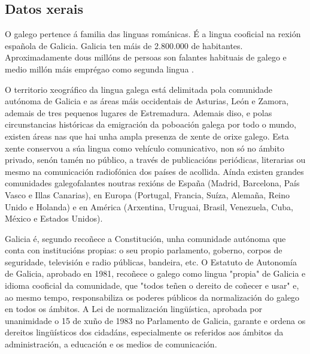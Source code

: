 \clearpage


\begin{multicols}{2}

\subsection{Datos xerais}

    O galego pertence á familia das linguas románicas. É a lingua cooficial na rexión española de Galicia. Galicia ten máis de 2.800.000 de habitantes. Aproximadamente dous millóns de persoas son falantes habituais de galego e medio millón máis emprégao como segunda lingua \cite{GAL-Nota5,GAL-Nota6}.


O territorio xeográfico da lingua galega está delimitada pola comunidade autónoma de Galicia e as áreas máis occidentais de Asturias, León e Zamora, ademais de tres pequenos lugares de Estremadura. Ademais diso, e polas circunstancias históricas da emigración da poboación galega por todo o mundo, existen áreas nas que hai unha ampla presenza de xente de orixe galego. Esta xente conservou a súa lingua como vehículo comunicativo, non só no ámbito privado, senón tamén no público, a través de publicacións periódicas, literarias ou mesmo na comunicación radiofónica dos países de acollida. Aínda existen grandes comunidades galegofalantes noutras rexións de España (Madrid, Barcelona, País Vasco e Illas Canarias), en Europa (Portugal, Francia, Suíza, Alemaña, Reino Unido e Holanda) e en América (Arxentina, Uruguai, Brasil, Venezuela, Cuba, México e Estados Unidos).
 
Galicia é, segundo recoñece a Constitución, unha comunidade autónoma que conta con institucións propias: o seu propio parlamento, goberno, corpos de seguridade, televisión e radio públicas, bandeira, etc. O Estatuto de Autonomía de Galicia, aprobado en 1981, recoñece o galego como lingua "propia" de Galicia e idioma cooficial da comunidade, que "todos teñen o dereito de coñecer e usar" e, ao mesmo tempo, responsabiliza os poderes públicos da normalización do galego en todos os ámbitos. A Lei de normalización lingüística, aprobada por unanimidade o 15 de xuño de 1983 no Parlamento de Galicia, garante e ordena os dereitos lingüísticos dos cidadáns, especialmente os referidos aos ámbitos da administración, a educación e os medios de comunicación. 


\end{multicols}
